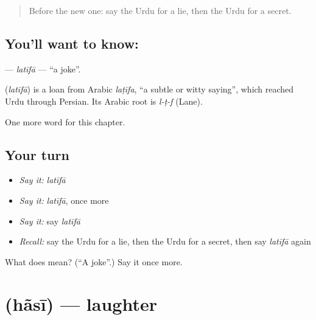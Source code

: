 \label{lesson:UR-C231-latifa}



\begin{quote}
Before the new one: say the Urdu for a lie, then the Urdu for a secret.
\end{quote}

\subsection*{You'll want to know: }
\textbf{} — \emph{latīfā} — \textquotedblleft{}a joke\textquotedblright{}.

\begin{cousinweb}
\textbf{} (\emph{latīfā}) is a loan from Arabic \emph{laṭīfa}, \textquotedblleft{}a subtle or witty saying\textquotedblright{}, which reached Urdu through Persian. Its Arabic root is \emph{l-ṭ-f} (Lane).
\end{cousinweb}

\begin{grammarlens}[title={What you've built}]
One more word for this chapter.
\end{grammarlens}

\subsection*{Your turn}
\begin{itemize}
\raggedright
  \item \emph{Say it:} \emph{latīfā}
  \item \emph{Say it:} \emph{latīfā}, once more
  \item \emph{Say it:} say \emph{latīfā}
  \item \emph{Recall:} say the Urdu for a lie, then the Urdu for a secret, then say \emph{latīfā} again
\end{itemize}

\begin{tcolorbox}[breakable,colback=teal!4,colframe=teal!35!black,title={Before you move on}]
What does  mean? (\textquotedblleft{}A joke\textquotedblright{}.) Say it once more.
\end{tcolorbox}
\section[\texorpdfstring{\ur{ہنسی} (hãsī)}{ہنسی (hãsī)}]{ (hãsī) — laughter}

\label{lesson:UR-C231-hasi}



